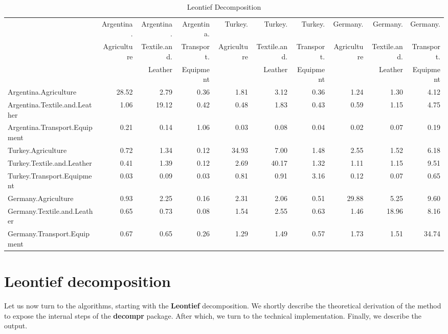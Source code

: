 \documentclass[a4paper]{article}\usepackage[]{graphicx}\usepackage[]{color}
\begin{document}
\begin{sidewaystable}
  \caption{Leontief Decomposition}
  \label{tab:leon}
  \begin{tabular}{lrrrrrrrrr}
    \hline
          & Argentina. & Argentina. & Argentina. & Turkey. & Turkey. & Turkey. & Germany. & Germany. & Germany.\\
          & Agriculture & Textile.and. & Transport. & Agriculture & Textile.and. & Transport. & Agriculture & Textile.and. & Transport.\\
          & & Leather & Equipment & & Leather & Equipment & & Leather & Equipment\\
    \hline
    Argentina.Agriculture & 28.52 & 2.79  & 0.36  & 1.81  & 3.12  & 0.36  & 1.24  & 1.30  & 4.12 \\
    Argentina.Textile.and.Leather & 1.06  & 19.12 & 0.42  & 0.48  & 1.83  & 0.43  & 0.59  & 1.15  & 4.75 \\
    Argentina.Transport.Equipment & 0.21  & 0.14  & 1.06  & 0.03  & 0.08  & 0.04  & 0.02  & 0.07  & 0.19 \\
    Turkey.Agriculture & 0.72  & 1.34  & 0.12  & 34.93 & 7.00  & 1.48  & 2.55  & 1.52  & 6.18 \\
    Turkey.Textile.and.Leather & 0.41  & 1.39  & 0.12  & 2.69  & 40.17 & 1.32  & 1.11  & 1.15  & 9.51 \\
    Turkey.Transport.Equipment & 0.03  & 0.09  & 0.03  & 0.81  & 0.91  & 3.16  & 0.12  & 0.07  & 0.65 \\
    Germany.Agriculture & 0.93  & 2.25  & 0.16  & 2.31  & 2.06  & 0.51  & 29.88 & 5.25  & 9.60 \\
    Germany.Textile.and.Leather & 0.65  & 0.73  & 0.08  & 1.54  & 2.55  & 0.63  & 1.46  & 18.96 & 8.16 \\
    Germany.Transport.Equipment & 0.67  & 0.65  & 0.26  & 1.29  & 1.49  & 0.57  & 1.73  & 1.51  & 34.74 \\
    \hline
    \end{tabular}
\end{sidewaystable}

\section{Leontief decomposition}
\label{sec:leontief}
Let us now turn to the algorithms, starting with the \textbf{Leontief} decomposition. We shortly describe the theoretical
derivation of the method to expose the internal steps of the \textbf{decompr} package. After which, we turn to the technical implementation.
Finally, we describe the output.
\end{document}
